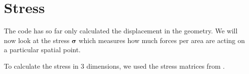 \section{Stress}

The code has so far only calculated the displacement in the geometry. We will now look at the stress $\bm{\sigma}$ which measures how much forces per area are acting on a particular spatial point. 

To calculate the stress in 3 dimensions, we used the stress matrices from \cite{stressMatrix}.


